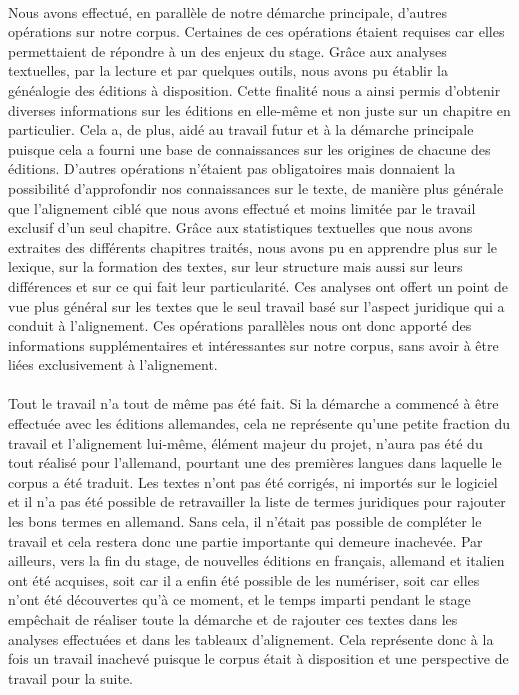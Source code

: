 \paragraph{} Nous avons effectué, en parallèle de notre démarche principale, d'autres opérations sur notre corpus. Certaines de ces opérations étaient requises car elles permettaient de répondre à un des enjeux du stage. Grâce aux analyses textuelles, par la lecture et par quelques outils, nous avons pu établir la généalogie des éditions à disposition. Cette finalité nous a ainsi permis d'obtenir diverses informations sur les éditions en elle-même et non juste sur un chapitre en particulier. Cela a, de plus, aidé au travail futur et à la démarche principale puisque cela a fourni une base de connaissances sur les origines de chacune des éditions. D'autres opérations n'étaient pas obligatoires mais donnaient la possibilité d'approfondir nos connaissances sur le texte, de manière plus générale que l'alignement ciblé que nous avons effectué et moins limitée par le travail exclusif d'un seul chapitre. Grâce aux statistiques textuelles que nous avons extraites des différents chapitres traités, nous avons pu en apprendre plus sur le lexique, sur la formation des textes, sur leur structure mais aussi sur leurs différences et sur ce qui fait leur particularité. Ces analyses ont offert un point de vue plus général sur les textes que le seul travail basé sur l'aspect juridique qui a conduit à l'alignement. Ces opérations parallèles nous ont donc apporté des informations supplémentaires et intéressantes sur notre corpus, sans avoir à être liées exclusivement à l'alignement.

\paragraph{} Tout le travail n'a tout de même pas été fait. Si la démarche a commencé à être effectuée avec les éditions allemandes, cela ne représente qu'une petite fraction du travail et l'alignement lui-même, élément majeur du projet, n'aura pas été du tout réalisé pour l'allemand, pourtant une des premières langues dans laquelle le corpus a été traduit. Les textes n'ont pas été corrigés, ni importés sur le logiciel et il n'a pas été possible de retravailler la liste de termes juridiques pour rajouter les bons termes en allemand. Sans cela, il n'était pas possible de compléter le travail et cela restera donc une partie importante qui demeure inachevée. Par ailleurs, vers la fin du stage, de nouvelles éditions en français, allemand et italien ont été acquises, soit car il a enfin été possible de les numériser, soit car elles n'ont été découvertes qu'à ce moment, et le temps imparti pendant le stage empêchait de réaliser toute la démarche et de rajouter ces textes dans les analyses effectuées et dans les tableaux d'alignement. Cela représente donc à la fois un travail inachevé puisque le corpus était à disposition et une perspective de travail pour la suite.

